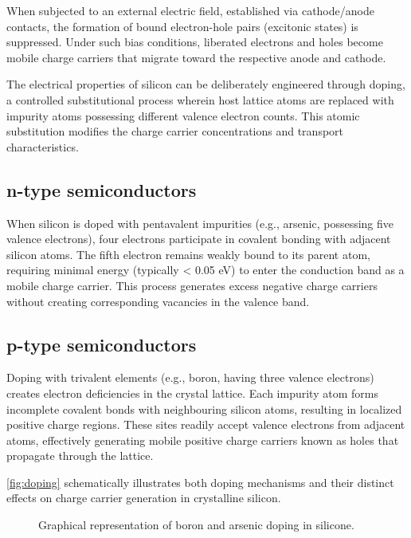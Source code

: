 When subjected to an external electric field, established via cathode/anode contacts, the formation of bound electron-hole pairs (excitonic states) is suppressed. Under such bias conditions, liberated electrons and holes become mobile charge carriers that migrate toward the respective anode and cathode.

The electrical properties of silicon can be deliberately engineered through doping, a controlled substitutional process wherein host lattice atoms are replaced with impurity atoms possessing different valence electron counts. This atomic substitution modifies the charge carrier concentrations and transport characteristics.
\subsection{n-type semiconductors}
When silicon is doped with pentavalent impurities (e.g., arsenic, possessing five valence electrons), four electrons participate in covalent bonding with adjacent silicon atoms. The fifth electron remains weakly bound to its parent atom, requiring minimal energy (typically < 0.05 eV) to enter the conduction band as a mobile charge carrier. This process generates excess negative charge carriers without creating corresponding vacancies in the valence band.

\subsection{p-type semiconductors}
Doping with trivalent elements (e.g., boron, having three valence electrons) creates electron deficiencies in the crystal lattice. Each impurity atom forms incomplete covalent bonds with neighbouring silicon atoms, resulting in localized positive charge regions. These sites readily accept valence electrons from adjacent atoms, effectively generating mobile positive charge carriers known as holes that propagate through the lattice.

\autoref{fig:doping} schematically illustrates both doping mechanisms and their distinct effects on charge carrier generation in crystalline silicon.

\begin{figure}[H]
	\centering
	\caption{Graphical representation of boron and arsenic doping in silicone.}
	\label{fig:doping}
\end{figure}
